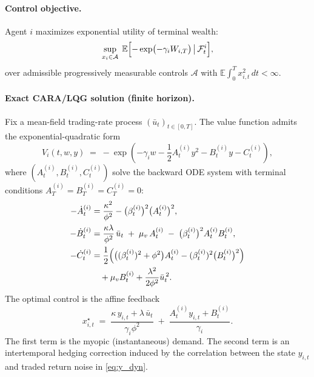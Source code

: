 \paragraph{Control objective.}
Agent $i$ maximizes exponential utility of terminal wealth:
\begin{equation}
\sup_{x_i\in\mathcal A}\;
\mathbb E\Bigl[-\exp\bigl(-\gamma_i W_{i,T}\bigr)\,\big|\,\mathcal F^i_t\Bigr],
\label{eq:exp_obj}
\end{equation}
over admissible progressively measurable controls $\mathcal A$ with
$\mathbb E\!\int_0^T x_{i,t}^2\,dt < \infty$.

\paragraph{Exact CARA/LQG solution (finite horizon).}
\begin{proposition}
\label{prop:ct_cara_lqg}
Fix a mean-field trading-rate process $(\bar u_t)_{t\in[0,T]}$.
The value function admits the exponential-quadratic form
\begin{equation}
V_i(t,w,y) \;=\; -\exp\!\left(-\gamma_i w - \frac12 A^{(i)}_t y^2 - B^{(i)}_t y - C^{(i)}_t\right),
\label{eq:V_form}
\end{equation}
where $(A^{(i)}_t,B^{(i)}_t,C^{(i)}_t)$ solve the backward ODE system with terminal conditions
$A^{(i)}_T=B^{(i)}_T=C^{(i)}_T=0$:
\begin{align}
-\dot A^{(i)}_t
&= \frac{\kappa^2}{\phi^2} - \bigl(\beta^{(i)}_t\bigr)^2\bigl(A^{(i)}_t\bigr)^2,
\label{eq:A_ode}\\
-\dot B^{(i)}_t
 &= \frac{\kappa\lambda}{\phi^2}\,\bar u_t \;+\; \mu_v\,A^{(i)}_t
    \;-\; \bigl(\beta^{(i)}_t\bigr)^2 A^{(i)}_t B^{(i)}_t,
\label{eq:B_ode}\\
-\dot C^{(i)}_t
&= \frac12\Bigl(\bigl((\beta^{(i)}_t)^2+\phi^2\bigr)A^{(i)}_t
      - (\beta^{(i)}_t)^2\bigl(B^{(i)}_t\bigr)^2\Bigr)\\
&\quad + \mu_v B^{(i)}_t + \frac{\lambda^2}{2\phi^2}\bar u_t^{\,2}.
\label{eq:C_ode}
\end{align}
The optimal control is the affine feedback
\begin{equation}
x_{i,t}^\star
\;=\; \frac{\kappa\,y_{i,t}+\lambda\,\bar u_t}{\gamma_i\phi^2}
      \;+\; \frac{A^{(i)}_t y_{i,t}+B^{(i)}_t}{\gamma_i}.
\label{eq:opt_control_lqg}
\end{equation}
The first term is the myopic (instantaneous) demand.
The second term is an intertemporal hedging correction induced by the correlation between the state $y_{i,t}$
and traded return noise in \eqref{eq:y_dyn}.
\end{proposition}


